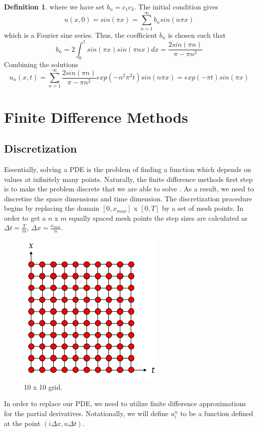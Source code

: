 \documentclass[12pt, oneside]{book}
\theoremstyle{plain}
\theoremstyle{definition}
\newtheorem{definition}[theorem]{Definition}
\begin{document}
\begin{definition}
where we have set $b_n = c_1 c_3$. The initial condition gives
\begin{equation}
u(x,0) = sin(\pi x) = \sum_{n=1}^{\infty} b_n sin(n \pi x)
\end{equation}
which is a Fourier sine series. Thus, the coefficient $b_n$ is chosen such that
\begin{equation}
b_n = 2 \int_{0}^{1} sin(\pi x) sin(\pi n x) dx = \frac{2sin(\pi n)}{\pi - \pi n^2}
\end{equation}
Combining the solutions
\begin{equation}
u_n(x,t) = \sum_{n=1}^{\infty} \frac{2sin(\pi n)}{\pi - \pi n^2} exp(-n^2 \pi ^2 t) sin(n \pi x)= exp(-\pi t) sin(\pi x)
\end{equation}
\end{definition}

\section{Finite Difference Methods}
\subsection{Discretization}
Essentially, solving a PDE is the problem of finding a function which depends on values at infinitely many points. Naturally, the finite difference methods first step is to make the problem discrete that we are able to solve \cite{jwthomas}. As a result, we need to discretise the space dimensions and time dimension. The discretization procedure begins by replacing the domain $[0, x_{max}]$ x  $[0, T]$  by a set of mesh points. In order to get a $n$ x $m$ equally spaced mesh points the step sizes are calculated as $ \Delta t = \frac{T}{m}$, $\Delta x = \frac{x_{max}}{n}$.

\begin{figure}[!htb]
    \centering
        \includegraphics[scale=0.8]{Discretize.png}
    \caption{10 x 10 grid.}
\end{figure}
In order to replace our PDE, we need to utilize finite difference approximations for the partial derivatives. Notationally, we will define $u^n_i$ to be a function defined at the point $(i \Delta x, n \Delta t) $.
\end{document}
